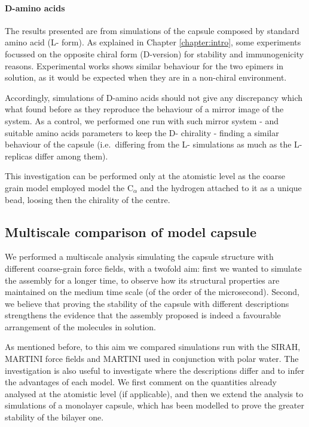 \paragraph{D-amino acids} The results presented are from simulations of the capsule composed by standard amino acid (L- form). As explained in Chapter \ref{chapter:intro}, some experiments focussed on the opposite chiral form (D-version) for stability and immunogenicity reasons. Experimental works shows similar behaviour for the two epimers in solution, as it would be expected when they are in a non-chiral environment.

Accordingly, simulations of D-amino acids should not give any discrepancy which what found before as they reproduce the behaviour of a mirror image of the system. As a control, we performed one run with such mirror system - and suitable amino acids parameters to keep the D- chirality - finding a similar behaviour of the capsule (i.e.\ differing from the L- simulations as much as the L- replicas differ among them).

This investigation can be performed only at the atomistic level as the coarse grain model employed model the C$_\alpha$ and the hydrogen attached to it as a unique bead, loosing then the chirality of the centre.


\subsection{Multiscale comparison of model capsule} \label{sec:res_multiscale}

We performed a multiscale analysis simulating the capsule structure with different coarse-grain force fields, with a twofold aim: first we wanted to simulate the assembly for a longer time, to observe how its structural properties are maintained on the medium time scale (of the order of the microsecond). Second, we believe that proving the stability of the capsule with different descriptions strengthens the evidence that the assembly proposed is indeed a favourable arrangement of the molecules in solution.

As mentioned before, to this aim we compared simulations run with the SIRAH, MARTINI force fields and MARTINI used in conjunction with polar water. The investigation is also useful to investigate where the descriptions differ and to infer the advantages of each model.
%
We first comment on the quantities already analysed at the atomistic level (if applicable), and then we extend the analysis to simulations of a monolayer capsule, which has been modelled to prove the greater stability of the bilayer one.

